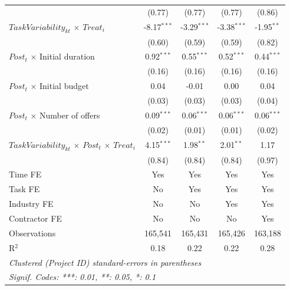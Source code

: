 \documentclass[
]{article}
\begin{document}
\begin{table}[htbp]
\begin{tabular}{lcccc}
                                                                    & (0.77)        & (0.77)        & (0.77)        & (0.86)\\   
      $TaskVariability_{kt}$ $\times$ $Treat_i$                     & -8.17$^{***}$ & -3.29$^{***}$ & -3.38$^{***}$ & -1.95$^{**}$\\   
                                                                    & (0.60)        & (0.59)        & (0.59)        & (0.82)\\   
      $Post_t$ $\times$ Initial duration                            & 0.92$^{***}$  & 0.55$^{***}$  & 0.52$^{***}$  & 0.44$^{***}$\\   
                                                                    & (0.16)        & (0.16)        & (0.16)        & (0.16)\\   
      $Post_t$ $\times$ Initial budget                              & 0.04          & -0.01         & 0.00          & 0.04\\   
                                                                    & (0.03)        & (0.03)        & (0.03)        & (0.04)\\   
      $Post_t$ $\times$ Number of offers                            & 0.09$^{***}$  & 0.06$^{***}$  & 0.06$^{***}$  & 0.06$^{***}$\\   
                                                                    & (0.02)        & (0.01)        & (0.01)        & (0.02)\\   
      $TaskVariability_{kt}$ $\times$ $Post_t$ $\times$ $Treat_i$   & 4.15$^{***}$  & 1.98$^{**}$   & 2.01$^{**}$   & 1.17\\   
                                                                    & (0.84)        & (0.84)        & (0.84)        & (0.97)\\   
      \midrule 
      Time FE                                                       & Yes           & Yes           & Yes           & Yes\\  
      Task FE                                                       & No            & Yes           & Yes           & Yes\\  
      Industry FE                                                   & No            & No            & Yes           & Yes\\  
      Contractor FE                                                 & No            & No            & No            & Yes\\  
      Observations                                                  & 165,541       & 165,431       & 165,426       & 163,188\\  
      R$^2$                                                         & 0.18          & 0.22          & 0.22          & 0.28\\  
      \midrule
      \multicolumn{5}{l}{\emph{Clustered (Project ID) standard-errors in parentheses}}\\
      \multicolumn{5}{l}{\emph{Signif. Codes: ***: 0.01, **: 0.05, *: 0.1}}\\
   \end{tabular}
   

\end{table}
\end{document}
